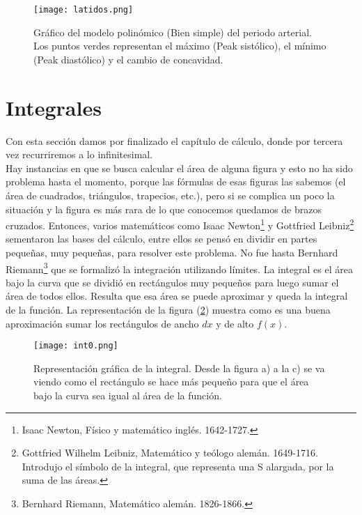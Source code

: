  \begin{center}
\begin{figure}[h!]
\centering
\texttt{[image: latidos.png]}
\caption[Gráfico del modelo polinómico del periodo arterial.]{Gráfico del modelo polinómico (Bien simple) del periodo arterial. Los puntos verdes representan el máximo (Peak sistólico), el mínimo (Peak diastólico) y el cambio de concavidad.} \label{farmacos}
\end{figure}
\end{center}
\section{Integrales}

Con esta sección damos por finalizado el capítulo de cálculo, donde por tercera vez recurriremos a lo infinitesimal.\\

Hay instancias en que se busca calcular el área de alguna figura y esto no ha sido problema hasta el momento, porque las fórmulas de esas figuras las sabemos (el área de cuadrados, triángulos, trapecios, etc.), pero si se complica un poco la situación y la figura es más rara de lo que conocemos quedamos de brazos cruzados. Entonces, varios matemáticos como Isaac Newton\footnote{Isaac Newton, Físico y matemático inglés. 1642-1727.} y Gottfried Leibniz\footnote{Gottfried Wilhelm Leibniz, Matemático y teólogo alemán. 1649-1716. Introdujo el símbolo de la integral, que representa una S alargada, por la suma de las áreas.} sementaron las bases del cálculo, entre ellos se pensó en dividir en partes pequeñas, muy pequeñas, para resolver este problema. No fue hasta Bernhard Riemann\footnote{
Bernhard Riemann, Matemático alemán. 1826-1866.} que se formalizó la integración utilizando límites. La integral es el área bajo  la curva que se dividió en rectángulos muy pequeños para luego sumar el área de todos ellos. Resulta que esa área se puede aproximar y queda la integral de la función. La representación de la figura (\ref{int0}) muestra como es una buena aproximación sumar los rectángulos de ancho $dx$ y de alto $f(x)$. 

\begin{center}
\begin{figure}[h!]
\centering
\texttt{[image: int0.png]}
\caption[Representación de la integral.]{Representación gráfica de la integral. Desde la figura a) a la c) se va viendo como el rectángulo se hace más pequeño para que el área bajo la curva sea igual al área de la función.} \label{int0}
\end{figure}
\end{center}

